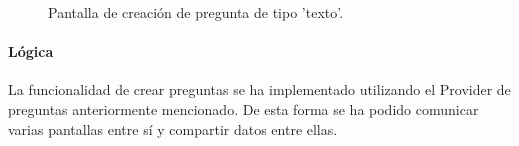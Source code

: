 \begin{figure}[H]%
  \centering
  \qquad
  \caption{Pantalla de creación de pregunta de tipo 'texto'.}%
  \label{fig:crearpreguntatexto}%
\end{figure}



\paragraph*{Lógica}
La funcionalidad de crear preguntas se ha implementado utilizando el Provider de preguntas anteriormente mencionado. De esta forma
se ha podido comunicar varias pantallas entre sí y compartir datos entre ellas. 

